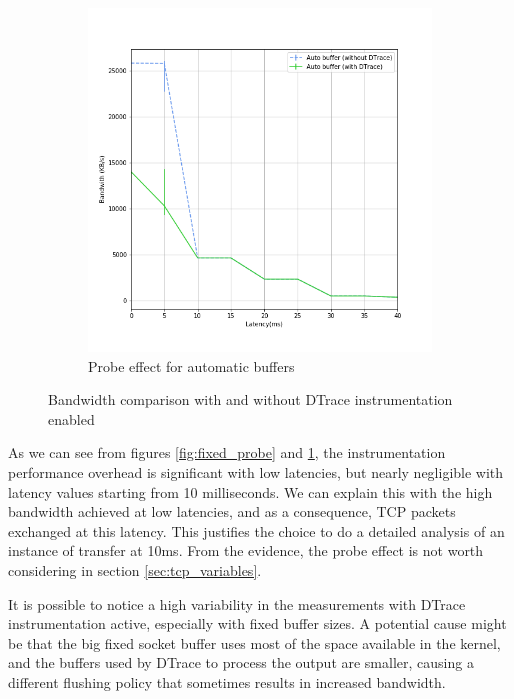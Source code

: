 \documentclass[a4paper,10pt]{article}
\begin{document}
\begin{figure}[]
\begin{subfigure}{0.5\textwidth}
   \includegraphics[width=\textwidth]{images/auto_probe_effect.png}
    \caption{Probe effect for automatic buffers}
    \label{fig:auto_probe}
\end{subfigure}

\caption[short]{Bandwidth comparison with and without DTrace instrumentation enabled}
\label{fig:probe_effect}
\end{figure}

As we can see from figures \ref{fig:fixed_probe} and \ref{fig:auto_probe}, the instrumentation performance overhead is significant with low latencies, but nearly negligible with latency values starting from 10 milliseconds. We can explain this with the high bandwidth achieved at low latencies, and as a consequence, TCP packets exchanged at this latency. This justifies the choice to do a detailed analysis of an instance of transfer at 10ms. From the evidence, the probe effect is not worth considering in section \ref{sec:tcp_variables}.

It is possible to notice a high variability in the measurements with DTrace instrumentation active, especially with fixed buffer sizes. A potential cause might be that the big fixed socket buffer uses most of the space available in the kernel, and the buffers used by DTrace to process the output are smaller, causing a different flushing policy that sometimes results in increased bandwidth.
\end{document}
